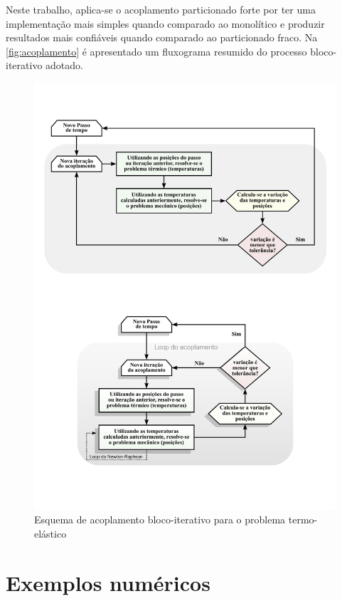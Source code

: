 \documentclass[Tese.tex]{subfiles}
\begin{document}
Neste trabalho, aplica-se o acoplamento particionado forte por ter uma implementação mais simples quando comparado ao monolítico e produzir resultados mais confiáveis quando comparado ao particionado fraco. Na \autoref{fig:acoplamento} é apresentado um fluxograma resumido do processo bloco-iterativo adotado.

\begin{figure}[!htb]
	\centering
	\caption{Esquema de acoplamento bloco-iterativo para o problema termo-elástico}
	\label{fig:acoplamento}
	\includegraphics[scale=0.85]{Figuras/acoplamento.pdf}
\end{figure}

\section{Exemplos numéricos}\label{sec:exemplos-termo}
\end{document}
